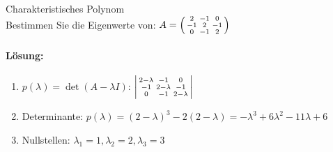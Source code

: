 \begin{example2}{Charakteristisches Polynom}\\
Bestimmen Sie die Eigenwerte von:
$A = \begin{psmallmatrix}
2 & -1 & 0 \\
-1 & 2 & -1 \\
0 & -1 & 2
\end{psmallmatrix}$

\paragraph{Lösung:}
\begin{enumerate}
    \item $p(\lambda) = \det(A-\lambda I)$:
    $\begin{vsmallmatrix}
    2-\lambda & -1 & 0 \\
    -1 & 2-\lambda & -1 \\
    0 & -1 & 2-\lambda
    \end{vsmallmatrix}$
    \vspace{1mm}\\
    \item Determinante:
    $p(\lambda) = (2-\lambda)^3 - 2(2-\lambda) = -\lambda^3 + 6\lambda^2 - 11\lambda + 6$
    \vspace{1mm}\\
    \item Nullstellen:
    $\lambda_1 = 1, \lambda_2 = 2, \lambda_3 = 3$
\end{enumerate}
\end{example2}

